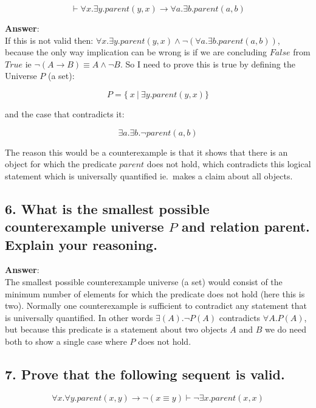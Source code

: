 \documentclass[a4paper, 14pt]{report}
\newcommand{\answer}[1]{%
	\begin{flushleft}
		\textbf{Answer}:\\
			#1
	\end{flushleft}}
\newcommand{\question}[1]{\subsection*{#1}}
\begin{document}
\[ 
	\vdash \forall{x}.\exists{y}.parent(y, x) \rightarrow \forall{a}.\exists{b}.parent(a, b) 
\]

\answer{If this is not valid then:
	$ \forall{x}.\exists{y}.parent(y, x) \wedge \neg (\forall{a}.\exists{b}.parent(a, b)) $,
	because the only way implication can be wrong is if we are concluding
	$False$ from $True$ ie $ \neg (A \rightarrow B) \equiv A \wedge \neg B$.
	So I need to prove this is true by defining the Universe $P$ (a set):

	\[ P = \{\ x\ |\ \exists{y}.parent(y, x)\} \]

	and the case that contradicts it:

	\[ \exists{a}.\exists{b}.\neg parent(a, b) \]

	The reason this would be a counterexample is that it shows that
	there is an object for which the predicate $ parent $ does not hold,
	which contradicts this logical statement which is universally
	quantified ie.\ makes a claim about all objects.}

\pagebreak

\question{6. What is the smallest possible counterexample universe $ P $ and relation parent. Explain your reasoning.}

\answer{The smallest possible counterexample universe (a set) would consist
	of the minimum number of elements for which the predicate does not hold (here this is two). 
	Normally one counterexample  is sufficient to contradict any
  statement that is universally quantified. In other words $\exists(A).\neg P(A)$ 
  contradicts $\forall{A}.P(A)$, but because this predicate is a statement
  about two objects $A$ and $B$ we do need both to show a single case where
  $P$ does not hold.}

\question{7. Prove that the following sequent is valid.}

\[ \forall{x}.\forall{y}.parent(x, y) \rightarrow \neg(x \equiv y) \vdash \neg \exists{x}.parent(x, x) \]

\hline

\end{document}
